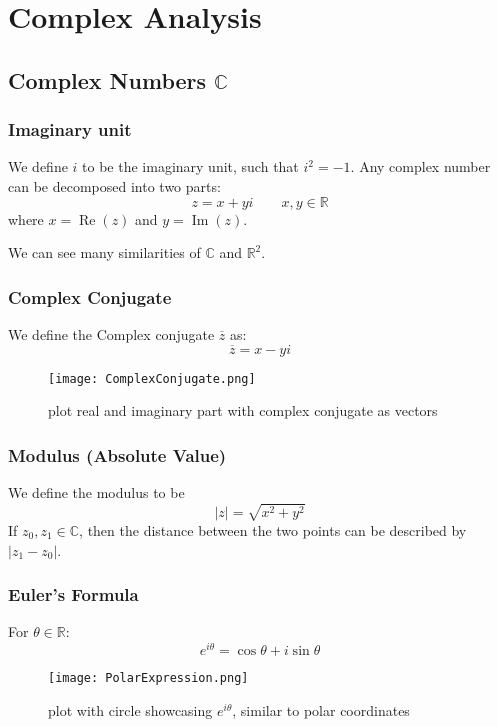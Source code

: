\chapter[Chapter 1]{Complex Analysis}

\section{Complex Numbers $\mathbb C$}
\subsection{Imaginary unit}
We define $i$ to be the imaginary unit, such that $i^2=-1$. Any complex number can be decomposed into two parts:
$$
z=x+yi\qquad x,y\in\mathbb R
$$
where $x=\operatorname{Re}(z)$ and $y=\operatorname{Im}(z)$.

We can see many similarities of $\mathbb C$ and $\mathbb R^2$.

\subsection{Complex Conjugate}
We define the Complex conjugate $\overline z$ as: 
$$
\overline z = x-yi
$$
\begin{figure}[H]
    \begin{center}
    \texttt{[image: ComplexConjugate.png]}
    \caption{plot real and imaginary part with complex conjugate as vectors}
    \end{center}
\end{figure}

\subsection{Modulus (Absolute Value)}
We define the modulus to be
$$
\lvert z \rvert = \sqrt{x^2+y^2}
$$
If $z_0,z_1\in\mathbb C$, then the distance between the two points can be described by $\lvert z_1-z_0\rvert$.


\subsection{Euler's Formula}
For $\theta\in \mathbb R$: 
$$
e^{i\theta} = \cos\theta + i\sin\theta
$$

\begin{figure}[H]
    \begin{center}
    \texttt{[image: PolarExpression.png]}
    \caption{plot with circle showcasing $e^{i\theta}$, similar to polar coordinates}
    \end{center}
\end{figure}


